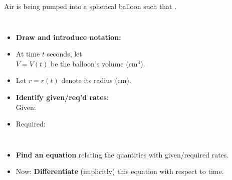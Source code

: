 
\begin{frame} %
\begin{example}
Air is being pumped into a spherical balloon such that .  
\begin{columns}[c]
\begin{itemize}
\item<2-> \textbf{Draw and introduce notation:}
\item<3->  At time $ t $ seconds, let\\
  $V=V(t) $ be the balloon's volume (cm$ ^3 $).
\item<4->  Let $r=r(t)$ denote its radius (cm).
\item<5->  \textbf{Identify given/req'd rates: }\\
Given: 
\item<7->    Required:  
\end{itemize}
\abovedisplayskip=0pt
\belowdisplayskip=0pt
\abovedisplayshortskip=0pt
\belowdisplayshortskip=0pt
\end{columns}
\begin{itemize}
\item<9->  \textbf{Find an equation} relating the quantities with given/required rates.
\item<11->  Now: \textbf{Differentiate} (implicitly) this equation  with respect to time.
\end{itemize}
\end{example}
\end{frame}




